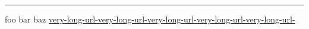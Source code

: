 \documentclass{article}
\begin{document}
\rule{\linewidth}{1pt}

foo bar baz \url{very-long-url-very-long-url-very-long-url-very-long-url-very-long-url-}
\end{document}
